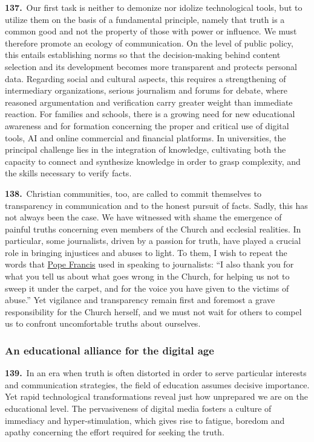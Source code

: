 \documentclass{article}
\begin{document}
\textbf{137.}\ Our first task is neither to demonize nor idolize technological tools, but to utilize them on the basis of a fundamental principle, namely that truth is a common good and not the property of those with power or influence. We must therefore promote an ecology of communication. On the level of public policy, this entails establishing norms so that the decision-making behind content selection and its development becomes more transparent and protects personal data. Regarding social and cultural aspects, this requires a strengthening of intermediary organizations, serious journalism and forums for debate, where reasoned argumentation and verification carry greater weight than immediate reaction. For families and schools, there is a growing need for new educational awareness and for formation concerning the proper and critical use of digital tools, AI and online commercial and financial platforms. In universities, the principal challenge lies in the integration of knowledge, cultivating both the capacity to connect and synthesize knowledge in order to grasp complexity, and the skills necessary to verify facts.

\textbf{138.}\ Christian communities, too, are called to commit themselves to transparency in communication and to the honest pursuit of facts. Sadly, this has not always been the case. We have witnessed with shame the emergence of painful truths concerning even members of the Church and ecclesial realities. In particular, some journalists, driven by a passion for truth, have played a crucial role in bringing injustices and abuses to light. To them, I wish to repeat the words that \href{https://www.vatican.va/content/francesco/en.html}{Pope Francis} used in speaking to journalists: ``I also thank you for what you tell us about what goes wrong in the Church, for helping us not to sweep it under the carpet, and for the voice you have given to the victims of abuse.''\cite{n146} Yet vigilance and transparency remain first and foremost a grave responsibility for the Church herself, and we must not wait for others to compel us to confront uncomfortable truths about ourselves.

\subsubsection{An educational alliance for the digital age}

\textbf{139.}\ In an era when truth is often distorted in order to serve particular interests and communication strategies, the field of education assumes decisive importance. Yet rapid technological transformations reveal just how unprepared we are on the educational level. The pervasiveness of digital media fosters a culture of immediacy and hyper-stimulation, which gives rise to fatigue, boredom and apathy concerning the effort required for seeking the truth.
\end{document}
